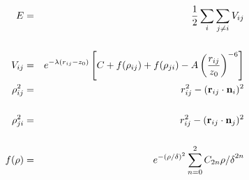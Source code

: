 \documentclass[aps,pr,onecolumn,superscriptaddress,noshowpacs,a4paper,15pt]{revtex4}
\begin{document}
\begingroup
\Large
\begin{eqnarray*}
  E & = & \frac{1}{2} \sum_i \sum_{j \neq i} V_{ij} \\[15pt]
  V_{ij} & = & e^{-\lambda (r_{ij} -z_0)} \left [ C + f(\rho_{ij}) + f(\rho_{ji}) - A \left ( \frac{r_{ij}}{z_0}\right )^{-6} \right ] \\
  \rho_{ij}^2 & = & r_{ij}^2 - ({\bf r}_{ij}\cdot {\bf n}_{i})^2 \\[15pt]
  \rho_{ji}^2 & = & r_{ij}^2 - ({\bf r}_{ij}\cdot  {\bf n}_{j})^2 \\[15pt]
  f(\rho) & = &  e^{-(\rho/\delta)^2} \sum_{n=0}^2 C_{2n} { \rho/\delta }^{2n}
\end{eqnarray*}
\endgroup
\end{document}
